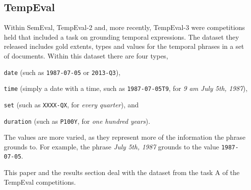 \subsection{TempEval}
Within SemEval, TempEval-2 and, more recently, TempEval-3 were competitions held that included a task on grounding temporal expressions. The dataset they released includes gold extents, types and values for the temporal phrases in a set of documents. Within this dataset there are four types, \begin{inparaenum}[\itshape 1\upshape)] \item \texttt{date} (such as \texttt{1987-07-05} or \texttt{2013-Q3}), \item \texttt{time} (simply a date with a time, such as \texttt{1987-07-05T9}, for \emph{9 am July 5th, 1987}), \item \texttt{set} (such as \texttt{XXXX-QX}, for \emph{every quarter}), and \item \texttt{duration} (such as \texttt{P100Y}, for \emph{one hundred years}).\end{inparaenum} The values are more varied, as they represent more of the information the phrase grounds to. For example, the phrase \emph{July 5th, 1987} grounds to the value \texttt{1987-07-05}.

This paper and the results section deal with the dataset from the task A of the TempEval competitions. 
